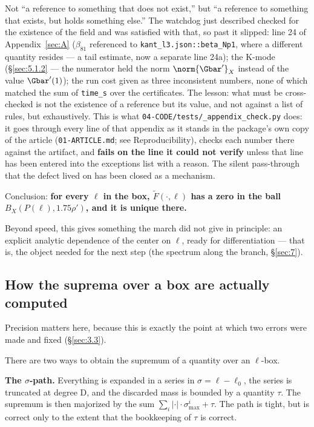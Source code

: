 \begin{remark}
Not ``a reference to
something that does not exist,'' but ``a reference to something that exists,
but holds something else.'' The watchdog just described checked for the existence
of the field and was satisfied with that, so past it slipped: line 24 of
Appendix~\ref{sec:A} ($\beta_{81}$ referenced to \texttt{kant\_\allowbreak l3.json::\allowbreak beta\_\allowbreak Np1}, where a different
quantity resides --- a tail estimate, now a separate line 24a); the K-mode
(\S\ref{sec:5.1.2} --- the numerator held the norm $\norm{\Gbar'}_X$ instead of the value
$\Gbar'(1)$); the run cost given as three inconsistent numbers, none of which
matched the sum of \texttt{time\_s} over the certificates. The lesson:
what must be cross-checked is not the existence of a reference but its
value, and not against a list of rules, but exhaustively. This is what
\texttt{04-\allowbreak CODE/\allowbreak tests/\allowbreak \_\allowbreak appendix\_\allowbreak check.py} does: it goes through every line of
that appendix as it stands in the package's own copy of the article
(\texttt{01-\allowbreak ARTICLE.md}; see Reproducibility), checks each number
there against the artifact, and \textbf{fails
on the line it could not verify} unless that line has been entered into the
exceptions list with a reason. The silent pass-through that the defect lived
on has been closed as a mechanism.
\end{remark}

Conclusion: \textbf{for every $\ell$ in the box, $\widetilde{F}(\cdot,\ell)$ has a zero in the ball
$B_X(P(\ell), 1.75\rho')$, and it is unique there.}

Beyond speed, this gives something the march did not give in principle: an
explicit analytic dependence of the center on $\ell$, ready for differentiation ---
that is, the object needed for the next step (the spectrum along the branch,
\S\ref{sec:7}).


\subsection{How the suprema over a box are actually computed}
\label{sec:3.2}

Precision matters here, because this is exactly the point at which two errors
were made and fixed (\S\ref{sec:3.3}).

There are two ways to obtain the supremum of a quantity over an $\ell$-box.

\textbf{The $\sigma$-path.} Everything is expanded in a series in $\sigma = \ell - \ell_0$, the series is
truncated at degree D, and the discarded mass is bounded by a quantity $\tau$. The
supremum is then majorized by the sum $\sum_i |\cdot| \cdot \sigma_{\max}^i + \tau$. The path is tight,
but is correct only to the extent that the bookkeeping of $\tau$ is correct.

